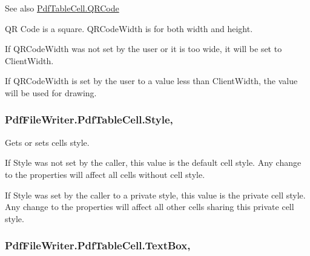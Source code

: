 \begin{DoxySeeAlso}{See also}
\hyperlink{class_pdf_file_writer_1_1_pdf_table_cell_a940f638dbb778196bc36633e9e64af26}{Pdf\+Table\+Cell.\+Q\+R\+Code}


\end{DoxySeeAlso}


QR Code is a square. Q\+R\+Code\+Width is for both width and height. 

If Q\+R\+Code\+Width was not set by the user or it is too wide, it will be set to Client\+Width. 

If Q\+R\+Code\+Width is set by the user to a value less than Client\+Width, the value will be used for drawing. 
\subsubsection[{\texorpdfstring{Style}{Style}}]{ Pdf\+File\+Writer.\+Pdf\+Table\+Cell.\+Style\hspace{0.3cm}{\ttfamily [get]}, {\ttfamily [set]}}\hypertarget{class_pdf_file_writer_1_1_pdf_table_cell_a34d92c5868a37dc6163997b3cef61229}{}\label{class_pdf_file_writer_1_1_pdf_table_cell_a34d92c5868a37dc6163997b3cef61229}


Gets or sets cell\textquotesingle{}s style. 

If Style was not set by the caller, this value is the default cell style. Any change to the properties will affect all cells without cell style. 

If Style was set by the caller to a private style, this value is the private cell style. Any change to the properties will affect all other cells sharing this private cell style. 
\subsubsection[{\texorpdfstring{Text\+Box}{TextBox}}]{ Pdf\+File\+Writer.\+Pdf\+Table\+Cell.\+Text\+Box\hspace{0.3cm}{\ttfamily [get]}, {\ttfamily [set]}}\hypertarget{class_pdf_file_writer_1_1_pdf_table_cell_a9ddbb591ca19d749d56af74626137e67}{}\label{class_pdf_file_writer_1_1_pdf_table_cell_a9ddbb591ca19d749d56af74626137e67}


